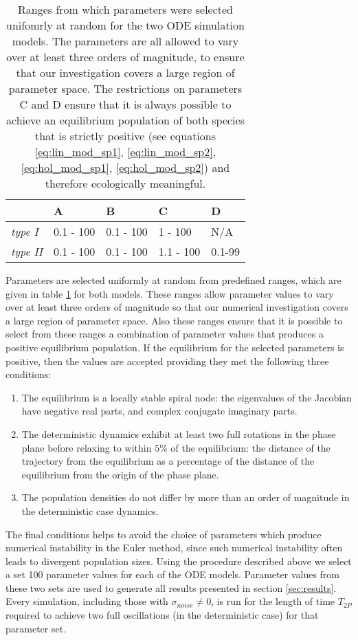 \begin{center}
\begin{table}
\centering
    \begin{tabular}{| l | l | l | l | l |}

    \hline
     & A & B & C & D\\ \hline
    \emph{type I} & 0.1 - 100 & 0.1 - 100 & 1 - 100 & N/A \\ \hline
    \emph{type II} & 0.1 - 100 & 0.1 - 100 & 1.1 - 100 & 0.1-99 \\
    \hline
    \end{tabular}
\caption{Ranges from which parameters were selected unifomrly at random for the two ODE simulation models. The parameters are all allowed to vary over at least three orders of magnitude, to ensure that our investigation covers a large region of parameter space. The restrictions on parameters C and D ensure that it is always possible to achieve an equilibrium population of both species that is strictly positive (see equations \ref{eq:lin_mod_sp1}, \ref{eq:lin_mod_sp2}, \ref{eq:hol_mod_sp1}, \ref{eq:hol_mod_sp2}) and therefore ecologically meaningful.}
\label{table:p_range}    
\end{table}
\end{center}

Parameters are selected uniformly at random from predefined ranges, which are given in table \ref{table:p_range} for both models. These ranges allow parameter values to vary over at least three orders of magnitude so that our numerical investigation covers a large region of parameter space. Also these ranges ensure that it is possible to select from these ranges a combination of parameter values that produces a positive equilibrium population. If the equilibrium for the selected parameters is positive, then the values are accepted providing they met the following three conditions:
 
\begin{enumerate}
	\item The equilibrium is a locally stable spiral node: the eigenvalues of the Jacobian have negative real parts, and complex conjugate imaginary parts.
	\item The deterministic dynamics exhibit at least two full rotations in the phase plane before relaxing to within $5\%$ of the equilibrium: the distance of the trajectory from the equilibrium as a percentage of the distance of the equilibrium from the origin of the phase plane.
	\item The population densities do not differ by more than an order of magnitude in the deterministic case dynamics.
\end{enumerate}
%
The final conditions helps to avoid the choice of parameters which produce numerical instability in the Euler method, since such numerical instability often leads to divergent population sizes. Using the procedure described above we select a set 100 parameter values for each of the ODE models. Parameter values from these two sets are used to generate all results presented in section \ref{sec:results}. Every simulation, including those with $\sigma_{noise} \neq 0$, is run for the length of time $T_{2P}$ required to achieve two full oscillations (in the deterministic case) for that parameter set.

